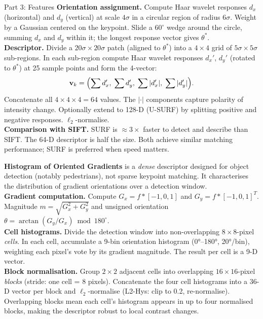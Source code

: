 \documentclass[letterpaper]{article}
\begin{document}
\begin{notes}{Part 3: Features}
\textbf{Orientation assignment.} Compute Haar wavelet responses $d_x$ (horizontal) and $d_y$ (vertical) at scale $4\sigma$ in a circular region of radius $6\sigma$. Weight by a Gaussian centered on the keypoint. Slide a $60^\circ$ wedge around the circle, summing $d_x$ and $d_y$ within it; the longest response vector gives $\theta^*$.\\

\textbf{Descriptor.} Divide a $20\sigma\times20\sigma$ patch (aligned to $\theta^*$) into a $4\times4$ grid of $5\sigma\times5\sigma$ sub-regions. In each sub-region compute Haar wavelet responses $d_x'$, $d_y'$ (rotated to $\theta^*$) at 25 sample points and form the 4-vector:
$$\mathbf{v}_k = \Bigl(\sum d_x',\;\sum d_y',\;\sum|d_x'|,\;\sum|d_y'|\Bigr).$$
Concatenate all $4\times4\times4 = 64$ values. The $|\cdot|$ components capture polarity of intensity change. Optionally extend to 128-D (U-SURF) by splitting positive and negative responses. $\ell_2$-normalise.\\

\textbf{Comparison with SIFT.} SURF is $\approx 3\times$ faster to detect and describe than SIFT. The 64-D descriptor is half the size. Both achieve similar matching performance; SURF is preferred when speed matters.


\textbf{Histogram of Oriented Gradients} is a \emph{dense} descriptor designed for object detection (notably pedestrians), not sparse keypoint matching. It characterises the distribution of gradient orientations over a detection window.\\

\textbf{Gradient computation.} Compute $G_x = f * [-1,0,1]$ and $G_y = f * [-1,0,1]^T$. Magnitude $m = \sqrt{G_x^2+G_y^2}$ and unsigned orientation $\theta = \arctan(G_y/G_x) \bmod 180^\circ$.\\

\textbf{Cell histograms.} Divide the detection window into non-overlapping $8\times8$-pixel \emph{cells}. In each cell, accumulate a 9-bin orientation histogram (0°--180°, 20°/bin), weighting each pixel's vote by its gradient magnitude. The result per cell is a 9-D vector.\\

\textbf{Block normalisation.} Group $2\times2$ adjacent cells into overlapping $16\times16$-pixel \emph{blocks} (stride: one cell = 8 pixels). Concatenate the four cell histograms into a $36$-D vector per block and $\ell_2$-normalise (L2-Hys: clip to 0.2, re-normalise). Overlapping blocks mean each cell's histogram appears in up to four normalised blocks, making the descriptor robust to local contrast changes.\\


\end{notes}
\end{document}
